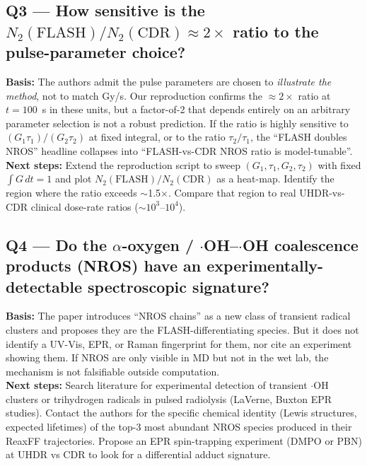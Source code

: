\subsection*{Q3 --- How sensitive is the $N_2(\text{FLASH})/N_2(\text{CDR})\approx 2\times$ ratio to the pulse-parameter choice?}
\textbf{Basis:} The authors admit the pulse parameters are chosen to \emph{illustrate the method}, not to match Gy/s. Our reproduction confirms the $\approx 2\times$ ratio at $t=100$~s in these units, but a factor-of-2 that depends entirely on an arbitrary parameter selection is not a robust prediction. If the ratio is highly sensitive to $(G_1\tau_1)/(G_2\tau_2)$ at fixed integral, or to the ratio $\tau_2/\tau_1$, the ``FLASH doubles NROS'' headline collapses into ``FLASH-vs-CDR NROS ratio is model-tunable''.\\
\textbf{Next steps:} Extend the reproduction script to sweep $(G_1, \tau_1, G_2, \tau_2)$ with fixed $\int G\, dt = 1$ and plot $N_2(\text{FLASH})/N_2(\text{CDR})$ as a heat-map. Identify the region where the ratio exceeds $\sim$1.5$\times$. Compare that region to real UHDR-vs-CDR clinical dose-rate ratios ($\sim 10^3$--$10^4$).

\subsection*{Q4 --- Do the $\alpha$-oxygen / $\cdot$OH--$\cdot$OH coalescence products (NROS) have an experimentally-detectable spectroscopic signature?}
\textbf{Basis:} The paper introduces ``NROS chains'' as a new class of transient radical clusters and proposes they are the FLASH-differentiating species. But it does not identify a UV-Vis, EPR, or Raman fingerprint for them, nor cite an experiment showing them. If NROS are only visible in MD but not in the wet lab, the mechanism is not falsifiable outside computation.\\
\textbf{Next steps:} Search literature for experimental detection of transient $\cdot$OH clusters or trihydrogen radicals in pulsed radiolysis (LaVerne, Buxton EPR studies). Contact the authors for the specific chemical identity (Lewis structures, expected lifetimes) of the top-3 most abundant NROS species produced in their ReaxFF trajectories. Propose an EPR spin-trapping experiment (DMPO or PBN) at UHDR vs CDR to look for a differential adduct signature.


